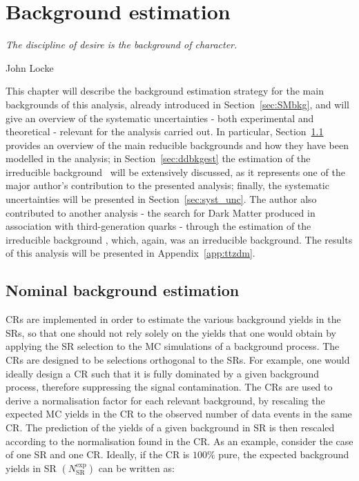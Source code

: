 \chapter{Background estimation}
\label{ch:bkgest}
\epigraph{\emph{The discipline of desire is the background of character.}}{John Locke}

	This chapter will describe the background estimation strategy for the main backgrounds of this analysis, already introduced in Section~\ref{sec:SMbkg}, and will give an overview of the systematic uncertainties - both experimental and theoretical - relevant for the analysis carried out. In particular, Section~\ref{sec:bkgest} provides an overview of the main reducible backgrounds and how they have been modelled in the analysis; in Section~\ref{sec:ddbkgest} the estimation of the irreducible background \ttZ\ will be extensively discussed, as it represents one of the major author's contribution to the presented analysis; finally, the systematic uncertainties will be presented in Section~\ref{sec:syst_unc}. The author also contributed to another analysis - the search for Dark Matter produced in association with third-generation quarks - through the estimation of the irreducible background \ttZ, which, again, was an irreducible background. The results of this analysis will be presented in Appendix~\ref{app:ttzdm}. 

	\section{Nominal background estimation}
	\label{sec:bkgest}

		\acp{CR} are implemented in order to estimate the various background yields in the \acp{SR}, so that one should not rely solely on the yields that one would obtain by applying the \ac{SR} selection to the \ac{MC} simulations of a background process. The \acp{CR} are designed to be selections orthogonal to the \acp{SR}. For example, one would ideally design a \ac{CR} such that it is fully dominated by a given background process, therefore suppressing the signal contamination. The \acp{CR} are used to derive a normalisation factor for each relevant background, by rescaling the expected \ac{MC} yields in the \ac{CR} to the observed number of data events in the same \ac{CR}. The prediction of the yields of a given background in \ac{SR} is then rescaled according to the normalisation found in the \ac{CR}. As an example, consider the case of one \ac{SR} and one \ac{CR}. Ideally, if the \ac{CR} is $100\%$ pure, the expected background yields in \ac{SR} $\left(N_{\mathrm{SR}}^{\mathrm{exp}}\right)$ can be written as:

